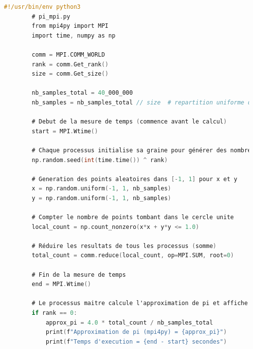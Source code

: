 \documentclass[a4paper,13pt]{book}
\begin{document}
	\begin{lstlisting}[language=C]
        #!/usr/bin/env python3
        # pi_mpi.py
        from mpi4py import MPI
        import time, numpy as np
        
        comm = MPI.COMM_WORLD
        rank = comm.Get_rank()
        size = comm.Get_size()
        
        nb_samples_total = 40_000_000
        nb_samples = nb_samples_total // size  # repartition uniforme des echantillons
        
        # Debut de la mesure de temps (commence avant le calcul)
        start = MPI.Wtime()
        
        # Chaque processus initialise sa graine pour générer des nombres aleatoires différents
        np.random.seed(int(time.time()) ^ rank)
        
        # Generation des points aleatoires dans [-1, 1] pour x et y
        x = np.random.uniform(-1, 1, nb_samples)
        y = np.random.uniform(-1, 1, nb_samples)
        
        # Compter le nombre de points tombant dans le cercle unite
        local_count = np.count_nonzero(x*x + y*y <= 1.0)
        
        # Réduire les resultats de tous les processus (somme)
        total_count = comm.reduce(local_count, op=MPI.SUM, root=0)
        
        # Fin de la mesure de temps
        end = MPI.Wtime()
        
        # Le processus maitre calcule l'approximation de pi et affiche le temps d'execution
        if rank == 0:
            approx_pi = 4.0 * total_count / nb_samples_total
            print(f"Approximation de pi (mpi4py) = {approx_pi}")
            print(f"Temps d'execution = {end - start} secondes")
        
        
\end{lstlisting}
\end{document}

